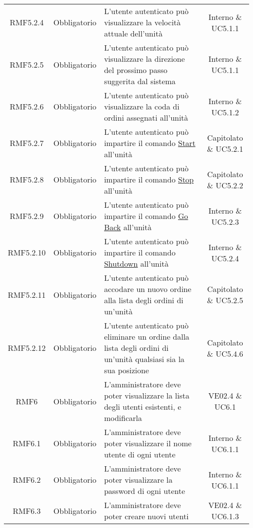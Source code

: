 \begin{longtable}[h!] { c c m{8cm} c}
		RMF5.2.4 & Obbligatorio & L'utente autenticato può visualizzare la velocità attuale dell'unità & Interno \& UC5.1.1 \\
		
		RMF5.2.5 & Obbligatorio & L'utente autenticato può visualizzare la direzione del prossimo passo suggerita dal sistema & Interno \& UC5.1.1 \\
		
		RMF5.2.6 & Obbligatorio & L'utente autenticato può visualizzare la coda di ordini assegnati all'unità & Interno \& UC5.1.2 \\
		
		RMF5.2.7 & Obbligatorio & L'utente autenticato può impartire il comando \underline{Start} all'unità & Capitolato \& UC5.2.1 \\
		
		RMF5.2.8 & Obbligatorio & L'utente autenticato può impartire il comando \underline{Stop} all'unità & Capitolato \& UC5.2.2 \\
		
		RMF5.2.9 & Obbligatorio & L'utente autenticato può impartire il comando \underline{Go Back} all'unità & Interno \& UC5.2.3 \\
		
		RMF5.2.10 & Obbligatorio & L'utente autenticato può impartire il comando \underline{Shutdown} all'unità & Interno \& UC5.2.4 \\
		
		RMF5.2.11 & Obbligatorio & L'utente autenticato può accodare un nuovo ordine alla lista degli ordini di un'unità & Capitolato \& UC5.2.5 \\
		
		RMF5.2.12 & Obbligatorio & L'utente autenticato può eliminare un ordine dalla lista degli ordini di un'unità qualsiasi sia la sua posizione & Capitolato \& UC5.4.6 \\
		
		RMF6 & Obbligatorio & L'amministratore deve poter visualizzare la lista degli utenti esistenti, e modificarla & VE02.4 \& UC6.1 \\
		
		RMF6.1 & Obbligatorio & L'amministratore deve poter visualizzare il nome utente di ogni utente & Interno \& UC6.1.1 \\
		
		RMF6.2 & Obbligatorio & L'amministratore deve poter visualizzare la password di ogni utente & Interno \& UC6.1.1 \\
		
		RMF6.3 & Obbligatorio & L'amministratore deve poter creare nuovi utenti & VE02.4 \& UC6.1.3 \\
		

\end{longtable}

